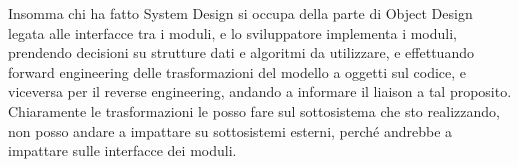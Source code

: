             \vspace{1mm}
            Insomma chi ha fatto System Design si occupa della parte di Object Design legata alle interfacce tra i moduli, e lo sviluppatore implementa i moduli, prendendo decisioni su strutture dati e algoritmi da utilizzare, e effettuando forward engineering delle trasformazioni del modello a oggetti sul codice, e viceversa per il reverse engineering, andando a informare il liaison a tal proposito. Chiaramente le trasformazioni le posso fare sul sottosistema che sto realizzando, non posso andare a impattare su sottosistemi esterni, perché andrebbe a impattare sulle interfacce dei moduli.